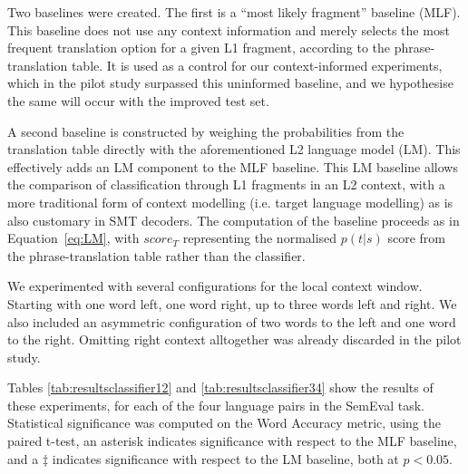 Two baselines were created. The first is a ``most likely fragment'' baseline
(MLF). This baseline does not use any context information and merely selects
the most frequent translation option for a given L1 fragment, according to the
phrase-translation table. It is used as a control for our context-informed
experiments, which in the pilot study surpassed this uninformed baseline, and
we hypothesise the same will occur with the improved test set.

A second baseline is constructed by weighing the probabilities from the
translation table directly with the aforementioned L2 language model (LM). This
effectively adds an LM component to the MLF baseline. This LM baseline allows
the comparison of classification through L1 fragments in an L2 context, with a
more traditional form of context modelling (i.e. target language modelling) as is
also customary in SMT decoders. The computation of the baseline proceeds as in
Equation~\ref{eq:LM}, with $score_T$ representing the normalised $p(t|s)$ score
from the phrase-translation table rather than the classifier.


We experimented with several configurations for the local context window. Starting
with one word left, one word right, up to three words left and right. We also
included an asymmetric configuration of two words to the left and one word to
the right. Omitting right context alltogether was already discarded in the pilot study.

Tables \ref{tab:resultsclassifier12} and \ref{tab:resultsclassifier34} show the
results of these experiments, for each of the four language pairs in the
SemEval task.  Statistical significance was computed on the Word Accuracy
metric, using the paired t-test, an asterisk indicates significance with respect to the
MLF baseline, and a $\ddagger$ indicates significance with respect to the LM baseline, both at $p < 0.05$.

